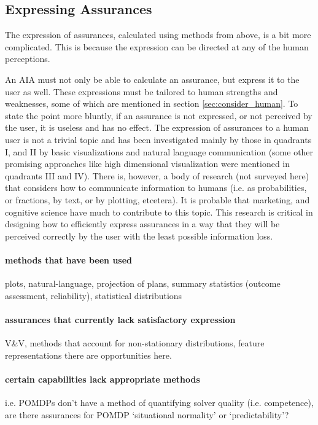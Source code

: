 \subsection{Expressing Assurances}
    The expression of assurances, calculated using methods from above, is a bit more complicated. This is because the expression can be directed at any of the human perceptions.

    An AIA must not only be able to calculate an assurance, but express it to the user as well. These expressions must be tailored to human strengths and weaknesses, some of which are mentioned in section \ref{sec:consider_human}. To state the point more bluntly, if an assurance is not expressed, or not perceived by the user, it is useless and has no effect. The expression of assurances to a human user is not a trivial topic and has been investigated mainly by those in quadrants I, and II by basic visualizations and natural language communication (some other promising approaches like high dimensional visualization were mentioned in quadrants III and IV). There is, however, a body of research (not surveyed here) that considers how to communicate information to humans (i.e. as probabilities, or fractions, by text, or by plotting, etcetera). It is probable that marketing, and cognitive science have much to contribute to this topic. This research is critical in designing how to efficiently express assurances in a way that they will be perceived correctly by the user with the least possible information loss.

    \paragraph{methods that have been used} plots, natural-language, projection of plans, summary statistics (outcome assessment, reliability), statistical distributions

    \paragraph{assurances that currently lack satisfactory expression} V\&V, methods that account for non-stationary distributions, feature representations there are opportunities here.

    \paragraph{certain capabilities lack appropriate methods} i.e. POMDPs don't have a method of quantifying solver quality (i.e. competence), are there assurances for POMDP `situational normality' or `predictability'?

